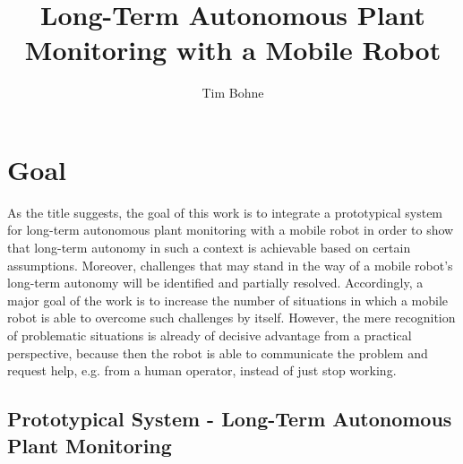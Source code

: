 \documentclass[english, master, expose, utf8]{base/thesis_KBS}
\begin{document}
\title{Long-Term Autonomous Plant Monitoring with a Mobile Robot}
\author{Tim Bohne}

\generatetitle

\section{Goal}

As the title suggests, the goal of this work is to integrate a prototypical system for long-term autonomous plant monitoring with a mobile robot
in order to show that long-term autonomy in such a context is achievable based on certain assumptions.
Moreover, challenges that may stand in the way of a mobile robot's long-term autonomy will be identified and partially resolved.
Accordingly, a major goal of the work is to increase the number of situations in which a mobile robot is able to overcome such challenges by itself.
However, the mere recognition of problematic situations is already of decisive advantage from a practical perspective, because then the robot is able 
to communicate the problem and request help, e.g. from a human operator, instead of just stop working.

\subsection{Prototypical System - Long-Term Autonomous Plant Monitoring}
\label{sec:prototypical_system}
\end{document}
